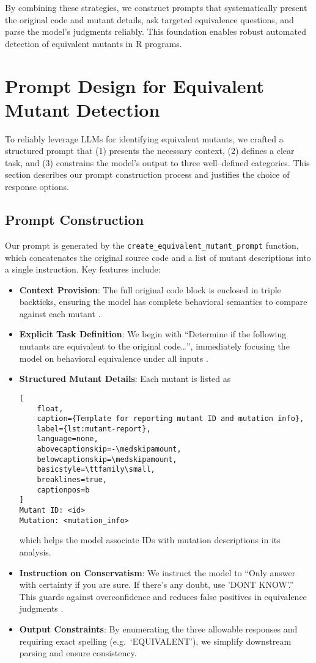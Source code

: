 By combining these strategies, we construct prompts that systematically present the original code and mutant details, ask targeted equivalence questions, and parse the model’s judgments reliably. This foundation enables robust automated detection of equivalent mutants in R programs.  

\section{Prompt Design for Equivalent Mutant Detection}

To reliably leverage LLMs for identifying equivalent mutants, we crafted a structured prompt that (1) presents the necessary context, (2) defines a clear task, and (3) constrains the model’s output to three well–defined categories.  This section describes our prompt construction process and justifies the choice of response options.

\subsection{Prompt Construction}

Our prompt is generated by the \texttt{create\_equivalent\_mutant\_prompt} function, which concatenates the original source code and a list of mutant descriptions into a single instruction.  Key features include:
\begin{itemize}
  \item \textbf{Context Provision}: The full original code block is enclosed in triple backticks, ensuring the model has complete behavioral semantics to compare against each mutant \cite{openai2023api}.
  \item \textbf{Explicit Task Definition}: We begin with “Determine if the following mutants are equivalent to the original code…”, immediately focusing the model on behavioral equivalence under all inputs \cite{liu2021pre}.
  \item \textbf{Structured Mutant Details}: Each mutant is listed as
  \begin{lstlisting}[
    float,
    caption={Template for reporting mutant ID and mutation info},
    label={lst:mutant-report},
    language=none,
    abovecaptionskip=-\medskipamount,
    belowcaptionskip=\medskipamount,
    basicstyle=\ttfamily\small,
    breaklines=true,
    captionpos=b
]
Mutant ID: <id>
Mutation: <mutation_info>
\end{lstlisting}

  which helps the model associate IDs with mutation descriptions in its analysis.
  \item \textbf{Instruction on Conservatism}: We instruct the model to “Only answer with certainty if you are sure. If there's any doubt, use 'DONT KNOW'.”  This guards against overconfidence and reduces false positives in equivalence judgments \cite{wei2022chain}.
  \item \textbf{Output Constraints}: By enumerating the three allowable responses and requiring exact spelling (e.g.\ ‘EQUIVALENT’), we simplify downstream parsing and ensure consistency.
\end{itemize}

